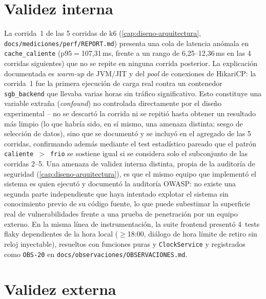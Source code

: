 \section{Validez interna}

La corrida~1 de las 5 corridas de k6 (\autoref{cap:diseno-arquitectura},
\texttt{docs/mediciones/perf/REPORT.md}) presenta una cola de latencia
anómala en \texttt{cache\_caliente} (p95$=$107{,}31\,ms, frente a un
rango de 6{,}25--12{,}36\,ms en las 4 corridas siguientes) que no se
repite en ninguna corrida posterior. La explicación documentada es
\emph{warm-up} de JVM/JIT y del \emph{pool} de conexiones de HikariCP:
la corrida~1 fue la primera ejecución de carga real contra un contenedor
\texttt{sgb\_backend} que llevaba varias horas sin tráfico significativo.
Esto constituye una variable extraña (\emph{confound}) no controlada
directamente por el diseño experimental -- no se descartó la corrida ni
se repitió hasta obtener un resultado más limpio (lo que habría sido, en
sí mismo, una amenaza distinta: sesgo de selección de datos), sino que
se documentó y se incluyó en el agregado de las 5 corridas, confirmando
además mediante el test estadístico pareado que el patrón
\texttt{caliente}~$>$~\texttt{frio} se sostiene igual si se considera
solo el subconjunto de las corridas 2--5. Una amenaza de validez interna
distinta, propia de la auditoría de seguridad
(\autoref{cap:diseno-arquitectura}), es que el mismo equipo que
implementó el sistema es quien ejecutó y documentó la auditoría OWASP: no
existe una segunda parte independiente que haya intentado explotar el
sistema sin conocimiento previo de su código fuente, lo que puede
subestimar la superficie real de vulnerabilidades frente a una prueba de
penetración por un equipo externo. En la misma línea de instrumentación,
la suite frontend presentó 4~tests flaky dependientes de la hora local
($\geq$18:00, diálogo de hora límite de retiro sin reloj inyectable),
resueltos con funciones puras y \texttt{ClockService} y registrados como
\texttt{OBS-20} en \texttt{docs/observaciones/OBSERVACIONES.md}.

\section{Validez externa}
\label{sec:validez-externa}


